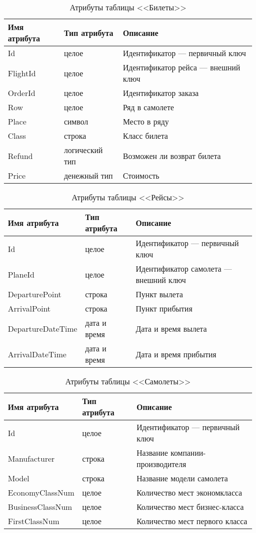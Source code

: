 \documentclass{bmstu}
\begin{document}
\begin{table}[H]
\caption{Атрибуты таблицы <<Билеты>>}
\label{tabular:tickets}
\begin{tabular}{|>{\raggedleft}p{4cm}|>{\raggedleft}p{3cm}|>{\raggedleft}p{8cm}|}
\hline
\textbf{Имя атрибута} & \textbf{Тип атрибута} & \textbf{Описание}
\tabularnewline
\hline
Id & целое & Идентификатор --- первичный ключ
\tabularnewline
\hline
FlightId & целое & Идентификатор рейса --- внешний ключ
\tabularnewline
\hline
OrderId & целое & Идентификатор заказа
\tabularnewline
\hline
Row & целое & Ряд в самолете
\tabularnewline
\hline
Place & символ & Место в ряду
\tabularnewline
\hline
Class & строка & Класс билета
\tabularnewline
\hline
Refund & логический тип & Возможен ли возврат билета
\tabularnewline
\hline
Price & денежный тип & Стоимость
\tabularnewline
\hline
\end{tabular}
\end{table}

\begin{table}[H]
\caption{Атрибуты таблицы <<Рейсы>>}
\label{tabular:flights}
\begin{tabular}{|>{\raggedleft}p{4cm}|>{\raggedleft}p{3cm}|>{\raggedleft}p{8cm}|}
\hline
\textbf{Имя атрибута} & \textbf{Тип атрибута} & \textbf{Описание}
\tabularnewline
\hline
Id & целое & Идентификатор --- первичный ключ
\tabularnewline
\hline
PlaneId & целое & Идентификатор самолета --- внешний ключ
\tabularnewline
\hline
DeparturePoint & строка & Пункт вылета
\tabularnewline
\hline
ArrivalPoint & строка & Пункт прибытия
\tabularnewline
\hline
DepartureDateTime & дата и время & Дата и время вылета
\tabularnewline
\hline
ArrivalDateTime & дата и время & Дата и время прибытия
\tabularnewline
\hline
\end{tabular}
\end{table}

\begin{table}[H]
\caption{Атрибуты таблицы <<Самолеты>>}
\label{tabular:planes}
\begin{tabular}{|>{\raggedleft}p{4cm}|>{\raggedleft}p{3cm}|>{\raggedleft}p{8cm}|}
\hline
\textbf{Имя атрибута} & \textbf{Тип атрибута} & \textbf{Описание}
\tabularnewline
\hline
Id & целое & Идентификатор --- первичный ключ
\tabularnewline
\hline
Manufacturer & строка & Название компании-производителя
\tabularnewline
\hline
Model & строка & Название модели самолета
\tabularnewline
\hline
EconomyClassNum & целое & Количество мест экономкласса
\tabularnewline
\hline
BusinessClassNum & целое & Количество мест бизнес-класса
\tabularnewline
\hline
FirstClassNum & целое & Количество мест первого класса
\tabularnewline
\hline
\end{tabular}
\end{table}
\end{document}
